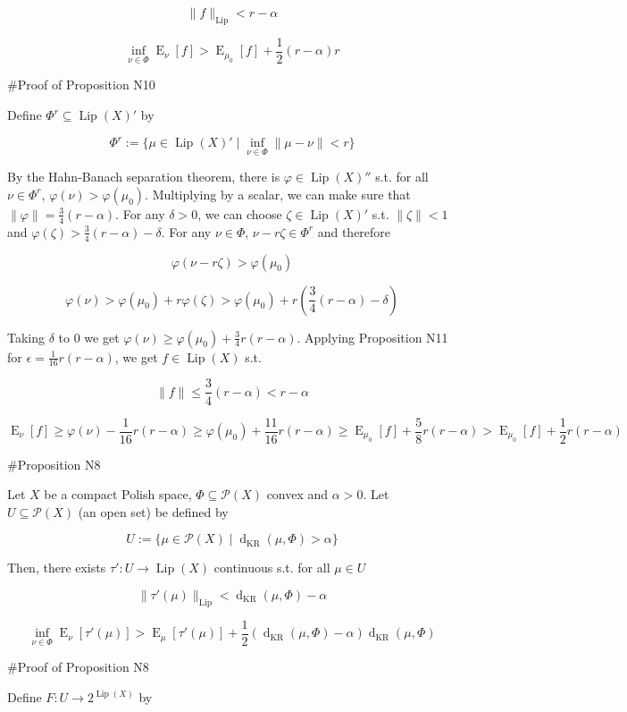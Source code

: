 \documentclass[a4paper]{article}
\DeclareMathOperator{\E}{E}
\newcommand{\Norm}[1]{\lVert #1 \rVert}
\newcommand{\Prob}{\mathcal{P}}
\newcommand{\Lip}{\operatorname{Lip}}
\newcommand{\NormL}[1]{\Norm{#1}_{\operatorname{Lip}}}
\newcommand{\Dkr}{\operatorname{d}_{\text{KR}}}
\begin{document}
$$\NormL{f} < r - \alpha$$

$$\inf_{\nu \in \Phi} \E_\nu[f] > \E_{\mu_0}[f] + \frac{1}{2}(r - \alpha) r$$

\#Proof of Proposition N10

Define $\Phi^r \subseteq \Lip(X)'$ by

$$\Phi^r:=\{\mu \in \Lip(X)' \mid \inf_{\nu \in \Phi} \Norm{\mu - \nu} < r\}$$

By the Hahn-Banach separation theorem, there is $\varphi \in \Lip(X)''$ s.t. for all $\nu \in \Phi^r$, $\varphi(\nu) > \varphi(\mu_0)$. Multiplying by a scalar, we can make sure that $\Norm{\varphi} = \frac{3}{4}(r - \alpha)$. For any $\delta > 0$, we can choose $\zeta \in \Lip(X)'$ s.t. $\Norm{\zeta} < 1$ and $\varphi(\zeta) > \frac{3}{4}(r-\alpha) - \delta$.  For any $\nu \in \Phi$, $\nu - r \zeta \in \Phi^r$ and therefore

$$\varphi(\nu - r \zeta) > \varphi(\mu_0)$$

$$\varphi(\nu) > \varphi(\mu_0) + r \varphi(\zeta) > \varphi(\mu_0) + r (\frac{3}{4}(r-\alpha) - \delta)$$

Taking $\delta$ to 0 we get $\varphi(\nu) \geq \varphi(\mu_0) + \frac{3}{4} r (r - \alpha)$. Applying Proposition N11 for $\epsilon = \frac{1}{16} r (r - \alpha)$, we get $f \in \Lip(X)$ s.t.

$$\Norm{f} \leq \frac{3}{4} (r - \alpha) < r - \alpha$$ 

$$\E_\nu[f] \geq \varphi(\nu) - \frac{1}{16} r (r - \alpha) \geq \varphi(\mu_0) + \frac{11}{16} r (r - \alpha) \geq \E_{\mu_0}[f] +  \frac{5}{8} r (r - \alpha) > \E_{\mu_0}[f] +  \frac{1}{2} r (r - \alpha)$$ 

\#Proposition N8

Let $X$ be a compact Polish space, $\Phi \subseteq \Prob(X)$ convex and $\alpha > 0$. Let $U \subseteq \Prob(X)$ (an open set) be defined by

$$U:=\{\mu \in \Prob(X) \mid \Dkr(\mu, \Phi) > \alpha\}$$

Then, there exists $\tau': U \rightarrow \Lip(X)$ continuous s.t. for all $\mu \in U$

$$\NormL{\tau'(\mu)} < \Dkr(\mu,\Phi) - \alpha$$

$$\inf_{\nu \in \Phi} \E_\nu[\tau'(\mu)] > \E_\mu[\tau'(\mu)] + \frac{1}{2}(\Dkr(\mu,\Phi) - \alpha) \Dkr(\mu,\Phi)$$

\#Proof of Proposition N8

Define $F: U \rightarrow 2^{\Lip(X)}$ by
\end{document}
